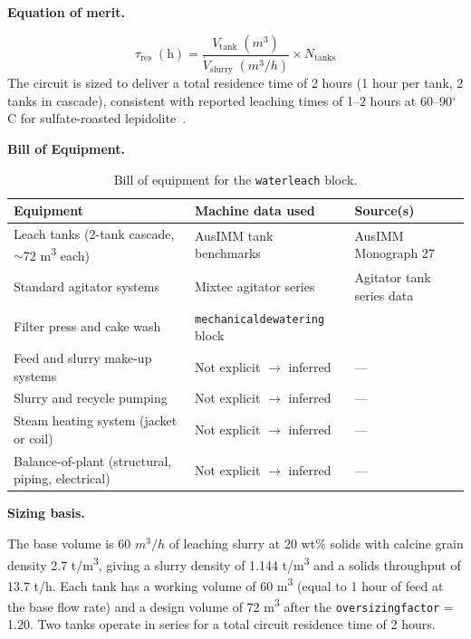 \documentclass{article}
\renewcommand\_{\textunderscore\allowbreak}
\begin{document}
\medskip
\noindent\textbf{Equation of merit.}\quad

\[
	\tau_\text{res}\;(\text{h}) = \frac{V_\text{tank}\;(\si{m^3})}{\dot{V}_\text{slurry}\;(\si{m^3/h})} \times N_\text{tanks}
\]
The circuit is sized to deliver a total residence time of 2 hours (1 hour per tank, 2 tanks in cascade), consistent with reported leaching times of 1--2 hours at 60--90$^\circ$C for sulfate-roasted lepidolite~\citep{yanExtractionLithiumLepidolite2012, dengSystematicReviewSulfate2026}.

\medskip
\noindent\textbf{Bill of Equipment.}\quad

\begin{table}[h!]
\caption{Bill of equipment for the \texttt{water\_leach} block.}
\centering
\begin{tabular}{>{\raggedright\arraybackslash}p{5.2cm}
				>{\raggedright\arraybackslash}p{4cm}
				>{\raggedright\arraybackslash}p{4.5cm}}
\toprule
\textbf{Equipment} & \textbf{Machine data used} & \textbf{Source(s)} \\
\midrule
Leach tanks (2-tank cascade, $\sim$72 \si{m^3} each) & AusIMM tank benchmarks & AusIMM Monograph 27 \\
Standard agitator systems & Mixtec agitator series & Agitator tank series data \\
Filter press and cake wash & \texttt{mechanical\_dewatering} block & \citet{porvooIndustrialFilterPress2025} \\
Feed and slurry make-up systems & Not explicit $\rightarrow$ inferred & --- \\
Slurry and recycle pumping & Not explicit $\rightarrow$ inferred & --- \\
Steam heating system (jacket or coil) & Not explicit $\rightarrow$ inferred & --- \\
Balance-of-plant (structural, piping, electrical) & Not explicit $\rightarrow$ inferred & --- \\
\bottomrule
\end{tabular}
\end{table}

\medskip
\noindent\textbf{Sizing basis.}\quad

The base volume is 60 $\si{m^3/h}$ of leaching slurry at 20 wt\% solids with calcine grain density 2.7 \si{t/m^3}, giving a slurry density of 1.144 \si{t/m^3} and a solids throughput of 13.7 t/h. Each tank has a working volume of 60 \si{m^3} (equal to 1 hour of feed at the base flow rate) and a design volume of 72 \si{m^3} after the \texttt{oversizing\_factor} = 1.20. Two tanks operate in series for a total circuit residence time of 2 hours.
\end{document}
